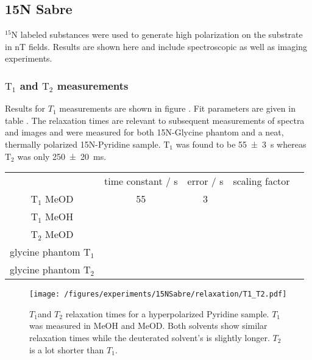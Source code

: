     \subsection{15N Sabre}
        $^{15}\mathrm{N}$ labeled substances were used to generate high polarization on the substrate in \si{\nano\tesla} fields. Results are shown here and include spectroscopic as well as imaging experiments.
    \subsubsection{$\mathrm{T_1}$ and $\mathrm{T_2}$ measurements}
        Results for $T_1$ measurements are shown in figure . Fit parameters are given in table .
        The relaxation times are relevant to subsequent measurements of spectra and images and were measured for both 15N-Glycine phantom and a neat, thermally polarized 15N-Pyridine sample. $\mathrm{T}_1$ was found to be \SI{55\pm 3}{\second} whereas $\mathrm{T}_2$ was only \SI{250\pm 20}{\milli\second}.
        \begin{table}
            \begin{tabular}{ccccc}
                    & time constant / s & error / s & scaling factor \\
                $\mathrm{T_1}$ MeOD & 55 & 3\\
                $\mathrm{T_1}$ MeOH &  \\
                $\mathrm{T_2}$ MeOD &  \\
                glycine phantom $\mathrm{T_1}$& \\
                glycine phantom $\mathrm{T_2}$& \\
            \end{tabular}
        \end{table}
        \begin{figure}
            \texttt{[image: /figures/experiments/15NSabre/relaxation/T1\_T2.pdf]}
            \caption{$T_1$and $T_2$ relaxation times for a hyperpolarized Pyridine sample. $T_1$ was measured in MeOH and MeOD. Both solvents show similar relaxation times while the deuterated solvent's is slightly longer. $T_2$ is a lot shorter than $T_1$.}
        \end{figure}
